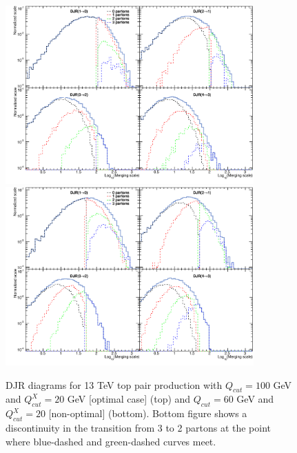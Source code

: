 \begin{figure}[!Hhtbp]
  \begin{center}
    \includegraphics[width=0.85\textwidth]{figs/DJR_q100_xq20_TTJets13TeV.png}
    \includegraphics[width=0.85\textwidth]{figs/DJR_q50_xq20_TTJets13TeV.png}
    \caption{DJR diagrams for 13 TeV top pair production with $Q_{cut}=100$ GeV and $Q^{X}_{cut}=20$ GeV [optimal case] (top) and $Q_{cut}=60$ GeV and $Q^{X}_{cut}=20$ [non-optimal] (bottom). Bottom figure shows a discontinuity in the transition from 3 to 2 partons at the point where blue-dashed and green-dashed curves meet.}
    \label{fig:TTJetsMerging}
  \end{center}
\end{figure}

